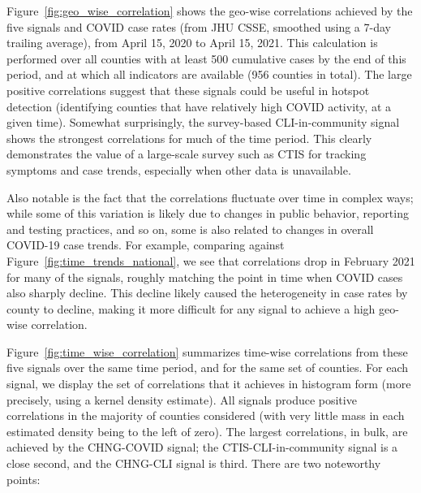 \documentclass[9pt,twocolumn,twoside,lineno]{pnas-new}
\begin{document}
Figure~\ref{fig:geo_wise_correlation} shows the geo-wise correlations achieved
by the five signals and COVID case rates (from JHU CSSE, smoothed using a 7-day
trailing average), from April 15, 2020 to April 15, 2021. This calculation is
performed over all counties with at least 500 cumulative cases by the end of
this period, and at which all indicators are available (956 counties in total).
The large positive correlations suggest that these signals could be useful in
hotspot detection (identifying counties that have relatively high COVID
activity, at a given time). Somewhat surprisingly, the survey-based
CLI-in-community signal shows the strongest correlations for much of the time
period. This clearly demonstrates the value of a large-scale survey such as CTIS
for tracking symptoms and case trends, especially when other data is
unavailable. 

Also notable is the fact that the correlations fluctuate over time in complex
ways; while some of this variation is likely due to changes in public behavior,
reporting and testing practices, and so on, some is also related to changes in
overall COVID-19 case trends. For example, comparing against
Figure~\ref{fig:time_trends_national}, we see that correlations drop in February
2021 for many of the signals, roughly matching the point in time when COVID
cases also sharply decline. This decline likely caused the heterogeneity in case
rates by county to decline, making it more difficult for any signal to achieve a
high geo-wise correlation.

Figure~\ref{fig:time_wise_correlation} summarizes time-wise correlations from
these five signals over the same time period, and for the same set of counties.
For each signal, we display the set of correlations that it achieves in
histogram form (more precisely, using a kernel density estimate). All signals
produce positive correlations in the majority of counties considered (with very
little mass in each estimated density being to the left of zero). The largest
correlations, in bulk, are achieved by the CHNG-COVID signal; the
CTIS-CLI-in-community signal is a close second, and the CHNG-CLI signal is
third. There are two noteworthy points:
\end{document}
